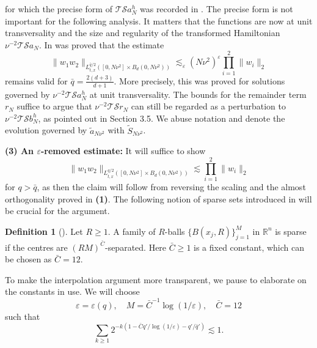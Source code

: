 \documentclass{amsart}
\numberwithin{equation}{section}
\theoremstyle{definition}
\newtheorem{definition}[theorem]{Definition}
\newcommand{\R}{\mathbb{R}}
\begin{document}
for which the precise form of $\mathcal{T} \mathcal{S} a_N^h$ was recorded in \cite[Proposition~5.15]{SchippaTataru2025}.
The precise form is not important for the following analysis. It matters that the functions are now at unit transversality and the size and regularity of the transformed Hamiltonian $\nu^{-2} \mathcal{T} \mathcal{S} a_N$. In \cite{SchippaTataru2025} was proved that the estimate
\begin{equation*}
\| w_1 w_2 \|_{L^{\bar{q}/2}_{t,x}([0,N \nu^2] \times B_d(0,N \nu^2))} \lesssim_\varepsilon (N \nu^2)^{\varepsilon} \prod_{i=1}^2 \| w_i \|_2
\end{equation*}
remains valid for $\bar{q} = \frac{2(d+3)}{d+1}$. More precisely, this was proved for solutions governed by $\nu^{-2} \mathcal{T} \mathcal{S} a^h_N$ at unit transversality. The bounds for the remainder term $r_N$ suffice to argue that $\nu^{-2} \mathcal{T} \mathcal{S} r_N$ can still be regarded as a perturbation to $\nu^{-2} \mathcal{T} \mathcal{S} b^h_N$, as pointed out in Section 3.5. We abuse notation and denote the evolution governed by $\tilde{a}_{N \nu^2}$ with $\tilde{S}_{N \nu^2}$.

\smallskip

\textbf{(3) An $\varepsilon$-removed estimate:} It will suffice to show
\begin{equation}
\label{eq:epsRemoved}
\| w_1 w_2 \|_{L^{q/2}_{t,x}([0,N \nu^2] \times B_d(0,N \nu^2))} \lesssim \prod_{i=1}^2 \| w_i \|_2
\end{equation}
for $q > \bar{q}$, as then the claim will follow from reversing the scaling and the almost orthogonality proved in \textbf{(1)}. The following notion of sparse sets introduced in \cite{Tao1998,Tao1999} will be crucial for the argument.

\begin{definition}[\cite{Tao1998,Tao1999}]
Let $R \geq 1$. A family of $R$-balls $\{B(x_j,R)\}_{j=1}^M$ in $\R^n$ is sparse if the centres are $(RM)^{\bar{C}}$-separated. Here $\bar{C} \geq 1$ is a fixed constant, which can be chosen as $\bar{C} = 12$.
\end{definition}

To make the interpolation argument more transparent, we pause to elaborate on the constants in use. We will choose
\begin{equation*}
\varepsilon = \varepsilon(q), \quad M = \bar{C}^{-1} \log(1/\varepsilon), \quad \bar{C} = 12
\end{equation*}
such that
\begin{equation*}
\sum_{k \geq 1} 2^{-k (1-\bar{C} q' / \log(1/\varepsilon) - q'/\bar{q}')} \lesssim 1.
\end{equation*}
\end{document}
